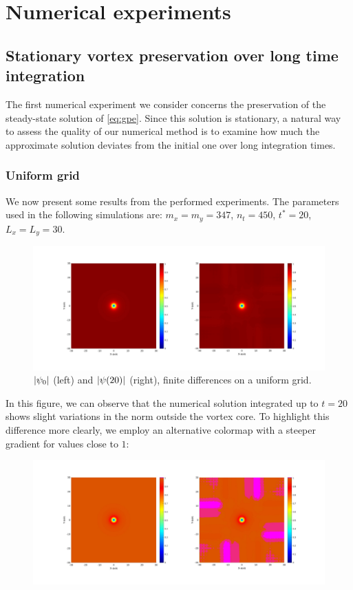 \chapter{Numerical experiments}

\section{Stationary vortex preservation over long time integration}

The first numerical experiment we consider concerns the preservation of the steady-state solution of \ref{eq:gpe}. Since this solution is stationary, a natural way to assess the quality of our numerical method is to examine how much the approximate solution deviates from the initial one over long integration times.

\subsection{Uniform grid}

We now present some results from the performed experiments. The parameters used in the following simulations are: $m_x = m_y = 347$, $n_t = 450$, $t^* = 20$, $L_x = L_y = 30$.

\begin{figure}[h!]
    \centering
    \includegraphics[width=\textwidth]{img/ltufd20t347s30L.pdf}
    \caption{$\left| \psi_0 \right|$ (left) and $\left| \psi(20) \right|$ (right), finite differences on a uniform grid.}
\end{figure}

In this figure, we can observe that the numerical solution integrated up to $t = 20$ shows slight variations in the norm outside the vortex core. To highlight this difference more clearly, we employ an alternative colormap with a steeper gradient for values close to $1$:

\begin{figure}[h!]
    \centering
    \includegraphics[width=\textwidth]{img/ltufd20t347s30L_color.pdf}
\end{figure}

